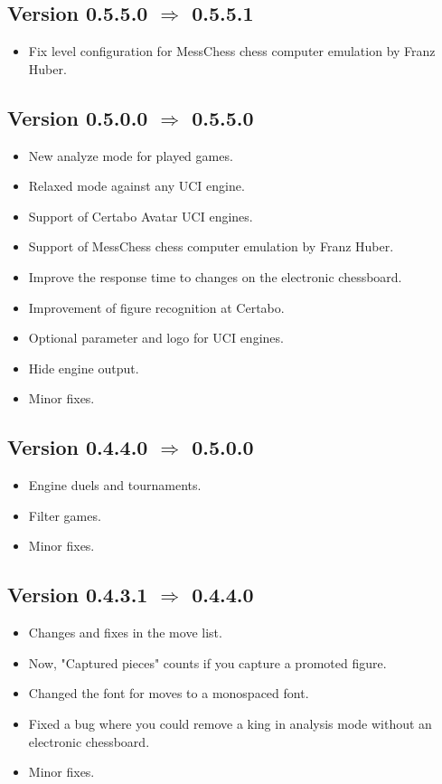 \documentclass[11pt,a4paper]{article}
\begin{document}
\subsection*{Version 0.5.5.0  $\Rightarrow$  0.5.5.1}
\begin{itemize}
	\item Fix level configuration for MessChess chess computer emulation by Franz Huber.	
\end{itemize}

\subsection*{Version 0.5.0.0  $\Rightarrow$  0.5.5.0}
\begin{itemize}
	\item New analyze mode for played games.
	\item Relaxed mode against any UCI engine.
	\item Support of Certabo Avatar UCI engines.
	\item Support of MessChess chess computer emulation by Franz Huber.	
	\item Improve the response time to changes on the electronic chessboard.
	\item Improvement of figure recognition at Certabo.			
	\item Optional parameter and logo for UCI engines.	
	\item Hide engine output.		
	\item Minor fixes.
\end{itemize}

\subsection*{Version 0.4.4.0  $\Rightarrow$  0.5.0.0}
\begin{itemize}
	\item Engine duels and tournaments.
	\item Filter games.
	\item Minor fixes.	
\end{itemize}

\subsection*{Version 0.4.3.1  $\Rightarrow$  0.4.4.0}
\begin{itemize}
	\item Changes and fixes in the move list.
    \item Now, "Captured pieces" counts if you capture a promoted figure.
	\item Changed the font for moves to a monospaced font.
	\item Fixed a bug where you could remove a king in analysis mode without an electronic chessboard.
	\item Minor fixes.	
\end{itemize}
\end{document}
